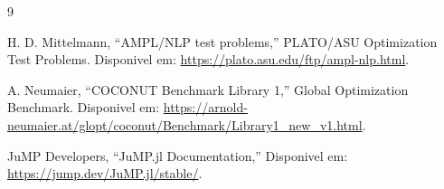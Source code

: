 \documentclass[preprint,12pt]{elsarticle}
\begin{document}
\begin{thebibliography}{9}

H. D. Mittelmann, ``AMPL/NLP test problems,'' PLATO/ASU Optimization Test Problems. Disponivel em: \url{https://plato.asu.edu/ftp/ampl-nlp.html}.

A. Neumaier, ``COCONUT Benchmark Library 1,'' Global Optimization Benchmark. Disponivel em: \url{https://arnold-neumaier.at/glopt/coconut/Benchmark/Library1_new_v1.html}.

JuMP Developers, ``JuMP.jl Documentation,'' Disponivel em: \url{https://jump.dev/JuMP.jl/stable/}.

\end{thebibliography}
\end{document}
